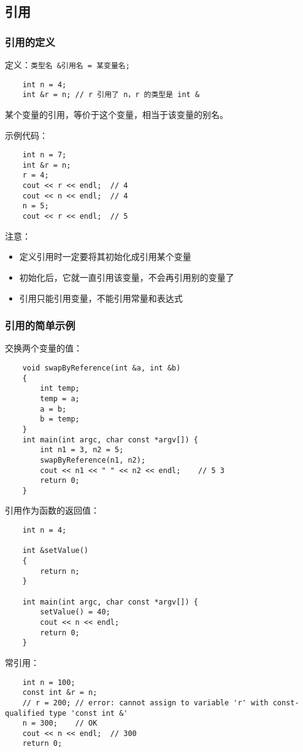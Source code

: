 \documentclass[UTF8]{ctexart}
\begin{document}
\subsection{引用}
\subsubsection{引用的定义}
定义：\texttt{类型名 &引用名 = 某变量名;}
\begin{verbatim}
    int n = 4;
    int &r = n; // r 引用了 n，r 的类型是 int &
\end{verbatim}
某个变量的引用，等价于这个变量，相当于该变量的别名。

示例代码：
\begin{verbatim}
    int n = 7;
    int &r = n;
    r = 4;
    cout << r << endl;  // 4
    cout << n << endl;  // 4
    n = 5;
    cout << r << endl;  // 5
\end{verbatim}

注意：
\begin{itemize}
    \item 定义引用时一定要将其初始化成引用某个变量
    \item 初始化后，它就一直引用该变量，不会再引用别的变量了
    \item 引用只能引用变量，不能引用常量和表达式
\end{itemize}

\subsubsection{引用的简单示例}
交换两个变量的值：
\begin{verbatim}
    void swapByReference(int &a, int &b)
    {
        int temp;
        temp = a;
        a = b;
        b = temp;
    }
    int main(int argc, char const *argv[]) {
        int n1 = 3, n2 = 5;
        swapByReference(n1, n2);
        cout << n1 << " " << n2 << endl;    // 5 3
        return 0;
    }
\end{verbatim}

引用作为函数的返回值：
\begin{verbatim}
    int n = 4;

    int &setValue()
    {
        return n;
    }

    int main(int argc, char const *argv[]) {
        setValue() = 40;
        cout << n << endl;
        return 0;
    }
\end{verbatim}

常引用：
\begin{verbatim}
    int n = 100;
    const int &r = n;
    // r = 200; // error: cannot assign to variable 'r' with const-qualified type 'const int &'
    n = 300;    // OK
    cout << n << endl;  // 300
    return 0;
\end{verbatim}
\end{document}
